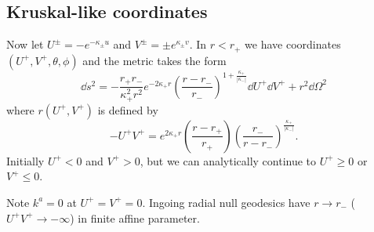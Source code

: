 \documentclass{jknotes}
\begin{document}
\subsection{Kruskal-like coordinates}
Now let \(U^\pm=-e^{-\kappa_\pm u}\) and \(V^\pm = \pm e^{\kappa_\pm v}\). In \(r<r_+\) we have coordinates \((U^+,V^+,\theta,\phi)\) and the metric takes the form
\begin{equation}
    \dd{s}^2 = -\frac{r_+r_-}{\kappa_+^2r^2}e^{-2\kappa_+r}\left(\frac{r-r_-}{r_-}\right)^{1+\frac{\kappa_+}{|\kappa_-|}}\dd{U^+}\dd{V^+} + r^2\dd{\Omega}^2
\end{equation}
where \(r(U^+,V^+)\) is defined by 
\begin{equation}
    -U^+V^+ = e^{2\kappa_+ r}\left(\frac{r-r_+}{r_+}\right)\left(\frac{r_-}{r-r_-}\right)^{\frac{\kappa_+}{|\kappa_-|}}.
\end{equation}
Initially \(U^+<0\) and \(V^+>0\), but we can analytically continue to \(U^+\ge 0\) or \(V^+\le 0\).
\begin{figure}[H]
    \centering
\end{figure}
Note \(k^a=0\) at \(U^+=V^+=0\). Ingoing radial null geodesics have \(r\to r_-\) (\(U^+V^+\to-\infty\)) in finite affine parameter.
\end{document}
